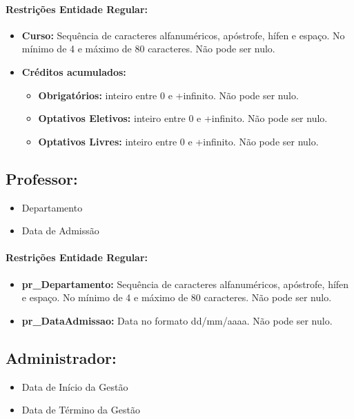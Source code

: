 \documentclass{report}
\begin{document}
\paragraph{Restrições Entidade Regular:}
\begin{itemize}
  \item \textbf{Curso:} Sequência de caracteres alfanuméricos, apóstrofe, hífen e espaço. No mínimo de 4 e máximo de 80 caracteres. Não pode ser nulo.
  \item \textbf{Créditos acumulados:}
  \begin{itemize}
  	\item \textbf{Obrigatórios:} inteiro entre 0 e +infinito. Não pode ser nulo.
  	\item \textbf{Optativos Eletivos:} inteiro entre 0 e +infinito. Não pode ser nulo.
  	\item \textbf{Optativos Livres:} inteiro entre 0 e +infinito. Não pode ser nulo.
  \end{itemize}
\end{itemize}

\subsection{Professor:}
\begin{itemize}
  \item Departamento
  \item Data de Admissão
\end{itemize}
\paragraph{Restrições Entidade Regular:}
\begin{itemize}
  \item \textbf{pr\_Departamento:} Sequência de caracteres alfanuméricos, apóstrofe, hífen e espaço. No mínimo de 4 e máximo de 80 caracteres. Não pode ser nulo.
  \item \textbf{pr\_DataAdmissao:} Data no formato dd/mm/aaaa. Não pode ser nulo.
\end{itemize}

\subsection{Administrador:}
\begin{itemize}
  \item Data de Início da Gestão
  \item Data de Término da Gestão
\end{itemize}
\end{document}
